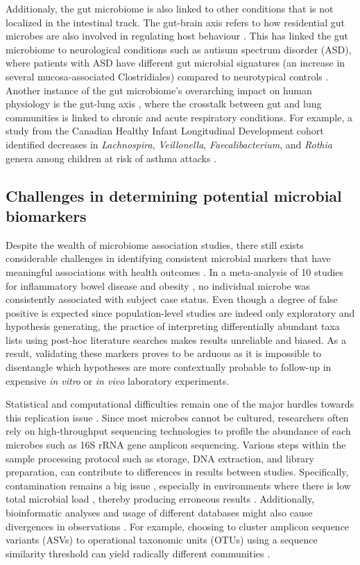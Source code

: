 Additionaly, the gut microbiome is also linked to other conditions that is not localized in the intestinal track. The gut-brain axis refers to how residential gut microbes are also involved in regulating host behaviour \cite{morais2021gut}. This has linked the gut microbiome to neurological conditions such as autisum spectrum disorder (ASD), where patients with ASD have different gut microbial signatures (an increase in several mucosa-associated Clostridiales) compared to neurotypical controls \cite{luna2017distinct}. Another instance of the gut microbiome's overarching impact on human physiology is the gut-lung axis \cite{enaud2020gutlung}, where the crosstalk between gut and lung communities is linked to chronic and acute respiratory conditions. For example, a study from the Canadian Healthy Infant Longitudinal Development cohort identified decreases in \emph{Lachnospira}, \emph{Veillonella}, \emph{Faecalibacterium}, and \emph{Rothia} genera among children at risk of asthma attacks \cite{arrietta2015early}. 


\subsection{Challenges in determining potential microbial biomarkers}
Despite the wealth of microbiome association studies, there still exists considerable challenges in identifying consistent microbial markers that have meaningful associations with health outcomes \cite{duvallet2017metaanalysis}. In a meta-analysis of 10 studies for inflammatory bowel disease and obesity \cite{walters2014metaanalyses}, no individual microbe was consistently associated with subject case status. Even though a degree of false positive is expected since population-level studies are indeed only exploratory and hypothesis generating, the practice of interpreting differentially abundant taxa lists using post-hoc literature searches makes results unreliable and biased. As a result, validating these markers proves to be arduous as it is impossible to disentangle which hypotheses are more contextually probable to follow-up in expensive \emph{in vitro} or \emph{in vivo} laboratory experiments.  

Statistical and computational difficulties remain one of the major hurdles towards this replication issue \cite{li2015microbiome, li2019comparative}. Since most microbes cannot be cultured, researchers often rely on high-throughput sequencing technologies to profile the abundance of each microbes such as 16S rRNA gene amplicon sequencing. Various steps within the sample processing protocol such as storage, DNA extraction, and library preparation, can contribute to differences in results between studies. Specifically, contamination remains a big issue \cite{}, especially in environments where there is low total microbial load \cite{}, thereby producing erroneous results \cite{}. Additionally, bioinformatic analyses and usage of different databases might also cause divergences in observations \cite{moossavi2020biological}. For example, choosing to cluster amplicon sequence variants (ASVs) to operational taxonomic units (OTUs) using a sequence similarity threshold can yield radically different communities \cite{chiarello2022ranking, moossavi2020biological}.   

